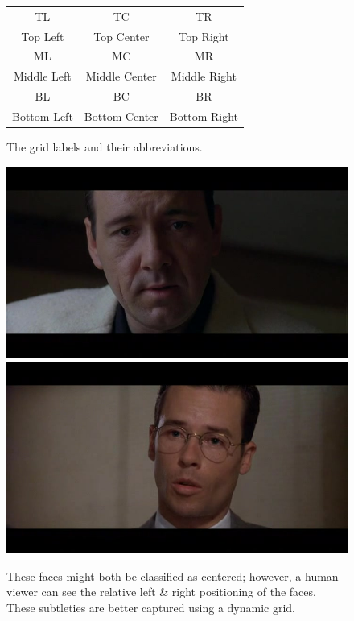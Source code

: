 \begin{figure}
  \begin{center}
  \begin{tabular}{ c |c |c }
    \large{TL} & \large{TC} & \large{TR}\\
    Top Left & Top Center & Top Right \\
    \hline
    \large{ML} & \large {MC} & \large {MR }\\
    Middle Left & Middle Center & Middle Right \\
    \hline
    \large{BL} & \large {BC} & \large {BR }\\ 
    Bottom Left & Bottom Center & Bottom Right
    \label{fig:gridLabels}
  \end{tabular}
  \caption{The grid labels and their abbreviations.}
\end{center}
\end{figure}

 \begin{figure}
\begin{center}
\includegraphics[width=0.98\linewidth]
    {fig/slightLeft.jpg}
\includegraphics[width=0.98\linewidth]
    {fig/slightRight.jpg}
\end{center}
\caption{These faces might both be classified as centered; however, a human viewer can see the relative left \& right positioning of the faces. These subtleties are better captured using a dynamic grid.}
\label{fig:leftRight}
\end{figure}


